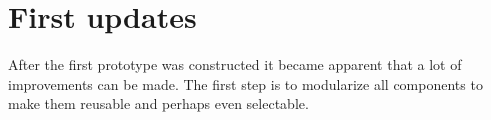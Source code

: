 \section{First updates} \label{ch:first_updates}

After the first prototype was constructed it became apparent that a lot of improvements can be made.
The first step is to modularize all components to make them reusable and perhaps even selectable.